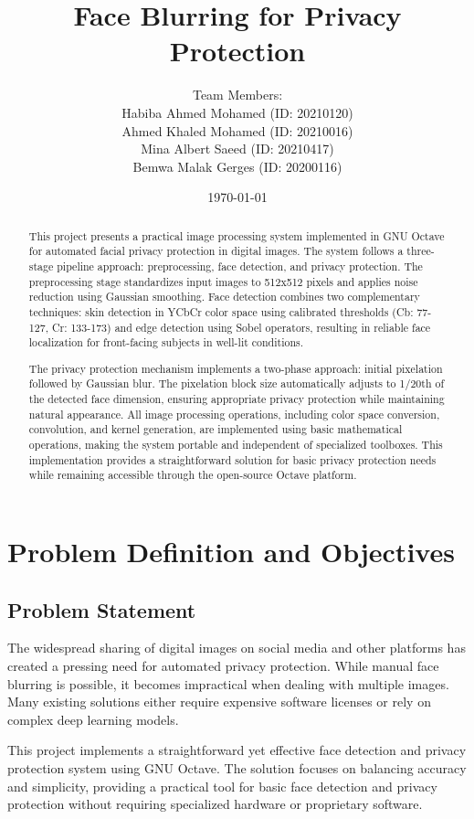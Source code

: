 \documentclass[12pt,a4paper]{article}
\title{Face Blurring for Privacy Protection}
\author{
Team Members: \\[0.5em]
Habiba Ahmed Mohamed (ID: 20210120) \\
Ahmed Khaled Mohamed (ID: 20210016) \\
Mina Albert Saeed (ID: 20210417) \\
Bemwa Malak Gerges (ID: 20200116)
}
\date{\today}
\begin{document}
\maketitle

\begin{abstract}
This project presents a practical image processing system implemented in GNU Octave for automated facial privacy protection in digital images. The system follows a three-stage pipeline approach: preprocessing, face detection, and privacy protection. The preprocessing stage standardizes input images to 512x512 pixels and applies noise reduction using Gaussian smoothing. Face detection combines two complementary techniques: skin detection in YCbCr color space using calibrated thresholds (Cb: 77-127, Cr: 133-173) and edge detection using Sobel operators, resulting in reliable face localization for front-facing subjects in well-lit conditions.

The privacy protection mechanism implements a two-phase approach: initial pixelation followed by Gaussian blur. The pixelation block size automatically adjusts to 1/20th of the detected face dimension, ensuring appropriate privacy protection while maintaining natural appearance. All image processing operations, including color space conversion, convolution, and kernel generation, are implemented using basic mathematical operations, making the system portable and independent of specialized toolboxes. This implementation provides a straightforward solution for basic privacy protection needs while remaining accessible through the open-source Octave platform.
\end{abstract}

\section{Problem Definition and Objectives}
\subsection{Problem Statement}
The widespread sharing of digital images on social media and other platforms has created a pressing need for automated privacy protection. While manual face blurring is possible, it becomes impractical when dealing with multiple images. Many existing solutions either require expensive software licenses or rely on complex deep learning models.

This project implements a straightforward yet effective face detection and privacy protection system using GNU Octave. The solution focuses on balancing accuracy and simplicity, providing a practical tool for basic face detection and privacy protection without requiring specialized hardware or proprietary software.
\end{document}
